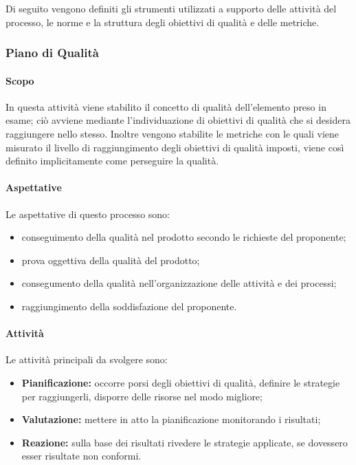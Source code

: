 Di seguito vengono definiti gli strumenti utilizzati a supporto delle attività del processo, le norme e la struttura
degli obiettivi di qualità e delle metriche.

\subsubsection{Piano di Qualità}
\label{ssub:pianificazione_qualita}

\paragraph{Scopo}

In questa attività viene stabilito il concetto di qualità dell'elemento preso in esame; ciò avviene mediante l'individuazione di obiettivi
di qualità che si desidera raggiungere nello stesso. Inoltre vengono stabilite le metriche con le quali viene misurato il livello di
raggiungimento degli obiettivi di qualità imposti, viene così definito implicitamente come perseguire la qualità.

\paragraph{Aspettative}
Le aspettative di questo processo sono:
\begin{itemize}
    \item conseguimento della qualità nel prodotto secondo le richieste del proponente;
    \item prova oggettiva della qualità del prodotto;
    \item consegumento della qualità nell'organizzazione delle attività e dei processi;
    \item raggiungimento della soddisfazione del proponente.
\end{itemize}

\paragraph{Attività}
Le attività principali da svolgere sono:
\begin{itemize}
    \item \textbf{Pianificazione:} occorre porsi degli obiettivi di qualità, definire le strategie per raggiungerli, disporre delle risorse nel modo migliore;
    \item \textbf{Valutazione:} mettere in atto la pianificazione monitorando i risultati;
    \item \textbf{Reazione:} sulla base dei risultati rivedere le strategie applicate, se dovessero esser risultate non conformi.
\end{itemize}

